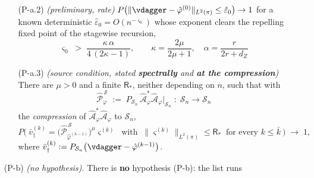 \begin{proposition}
\begin{enumerate}
\begin{enumerate}
\item[(P-a.2)] \emph{(preliminary, rate)} $P\big(\|\vdagger-\hat\varphi^{(0)}\|_{L^{2}(\pi)}\le\hat\varepsilon_0\big)\to1$
for a known deterministic $\hat\varepsilon_0=O(n^{-\varsigma_0})$ whose exponent clears the repelling
fixed point of the stagewise recursion,
\[
\varsigma_0\;>\;\frac{\kappa\,\alpha}{4\,(2\kappa-1)},
\qquad \kappa=\frac{2\mu}{2\mu+1},\quad\alpha=\frac{r}{2r+d_Z}
\]
\item[(P-a.3)] \emph{(source condition, stated \textbf{spectrally} and \textbf{at the compression})}
There are $\mu>0$ and a finite $\mathsf R_\ast$, neither depending on $n$, such that with
\begin{equation}\label{eq:compress}
\hat{\mathcal P}^{\,\mathcal S}_{\varphi}\;:=\;P_{\mathcal S_n}\,\hat{\mathcal A}^{\ast}_{\varphi}\hat{\mathcal A}_{\varphi}\big\vert_{\mathcal S_n}
\;:\;\mathcal S_n\to\mathcal S_n
\end{equation}
the \emph{compression} of $\hat{\mathcal A}^{\ast}_{\varphi}\hat{\mathcal A}_{\varphi}$ to
$\mathcal S_n$,
\[
P\Big(\ \bar v^{(k)}_\dagger=\big(\hat{\mathcal P}^{\,\mathcal S}_{\hat\varphi^{(k-1)}}\big)^{\mu}\varsigma^{(k)}
\ \text{ with }\ \big\|\varsigma^{(k)}\big\|_{L^{2}(\pi)}\le\mathsf R_\ast
\ \text{ for every }k\le\bar k\ \Big)\;\longrightarrow\;1 ,
\]
where $\bar v^{(k)}_\dagger:=P_{\mathcal S_n}\big(\vdagger-\hat\varphi^{(k-1)}\big)$.
\end{enumerate}
\item[(P-b)] \emph{(no hypothesis).} There is \textbf{no} hypothesis (P-b): the list runs

\end{enumerate}
\end{proposition}
